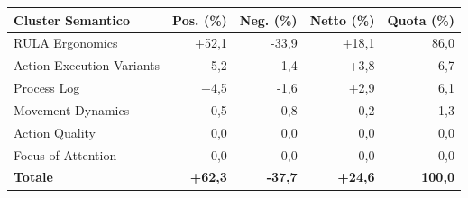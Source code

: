 \begin{tabular*}{\linewidth}{@{}l@{\extracolsep{\fill}}rrrr@{}}
\toprule
\textbf{Cluster Semantico} & \textbf{Pos. (\%)} & \textbf{Neg. (\%)} & \textbf{Netto (\%)} & \textbf{Quota (\%)} \\
\midrule
RULA Ergonomics & +52{,}1 & -33{,}9 & +18{,}1 & 86{,}0 \\
Action Execution Variants & +5{,}2 & -1{,}4 & +3{,}8 & 6{,}7 \\
Process Log & +4{,}5 & -1{,}6 & +2{,}9 & 6{,}1 \\
Movement Dynamics & +0{,}5 & -0{,}8 & -0{,}2 & 1{,}3 \\
Action Quality & 0{,}0 & 0{,}0 & 0{,}0 & 0{,}0 \\
Focus of Attention & 0{,}0 & 0{,}0 & 0{,}0 & 0{,}0 \\
\midrule
\textbf{Totale} & \textbf{+62{,}3} & \textbf{-37{,}7} & \textbf{+24{,}6} & \textbf{100{,}0} \\
\bottomrule
\end{tabular*}

